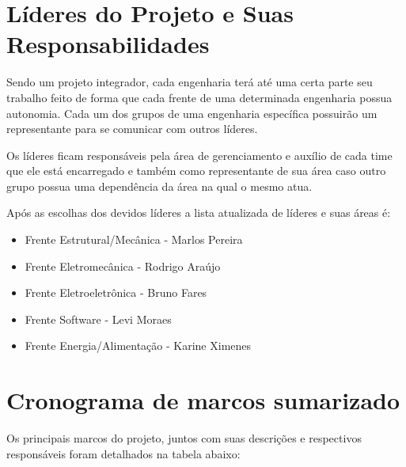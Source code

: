\begin{apendicesenv}
\section{Líderes do Projeto e Suas Responsabilidades}
Sendo um projeto integrador, cada engenharia terá até uma certa parte seu trabalho feito de forma que cada frente de uma determinada engenharia possua autonomia. Cada um dos grupos de uma engenharia específica possuirão um representante para se comunicar com outros líderes. 

Os líderes ficam responsáveis pela área de gerenciamento e auxílio de cada time que ele está encarregado e também como representante de sua área caso outro grupo possua uma dependência da área na qual o mesmo atua. 

Após as escolhas dos devidos líderes a lista atualizada de líderes e suas áreas é:

\begin{itemize}
	\item Frente Estrutural/Mecânica - Marlos Pereira
	\item Frente Eletromecânica - Rodrigo Araújo
	\item Frente Eletroeletrônica - Bruno Fares
	\item Frente Software - Levi Moraes
	\item Frente Energia/Alimentação - Karine Ximenes
\end{itemize}

\section{Cronograma de marcos sumarizado}
Os principais marcos do projeto, juntos com suas descrições e respectivos responsáveis foram detalhados  na tabela abaixo:  


\end{apendicesenv}
